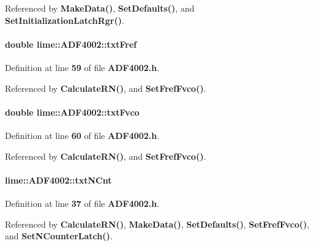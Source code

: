 Referenced by {\bf Make\+Data()}, {\bf Set\+Defaults()}, and {\bf Set\+Initialization\+Latch\+Rgr()}.

\paragraph[{txt\+Fref}]{\setlength{\rightskip}{0pt plus 5cm}double lime\+::\+A\+D\+F4002\+::txt\+Fref}\label{classlime_1_1ADF4002_a945c3e67afccc01ee081f1deaf9f9a40}


Definition at line {\bf 59} of file {\bf A\+D\+F4002.\+h}.



Referenced by {\bf Calculate\+R\+N()}, and {\bf Set\+Fref\+Fvco()}.

\paragraph[{txt\+Fvco}]{\setlength{\rightskip}{0pt plus 5cm}double lime\+::\+A\+D\+F4002\+::txt\+Fvco}\label{classlime_1_1ADF4002_a2ea713a7d2f2bd89bfe44f1361d0b6dc}


Definition at line {\bf 60} of file {\bf A\+D\+F4002.\+h}.



Referenced by {\bf Calculate\+R\+N()}, and {\bf Set\+Fref\+Fvco()}.

\paragraph[{txt\+N\+Cnt}]{ lime\+::\+A\+D\+F4002\+::txt\+N\+Cnt}\label{classlime_1_1ADF4002_aa767effcf67ea55bb8e530bdf6cbd497}


Definition at line {\bf 37} of file {\bf A\+D\+F4002.\+h}.



Referenced by {\bf Calculate\+R\+N()}, {\bf Make\+Data()}, {\bf Set\+Defaults()}, {\bf Set\+Fref\+Fvco()}, and {\bf Set\+N\+Counter\+Latch()}.


